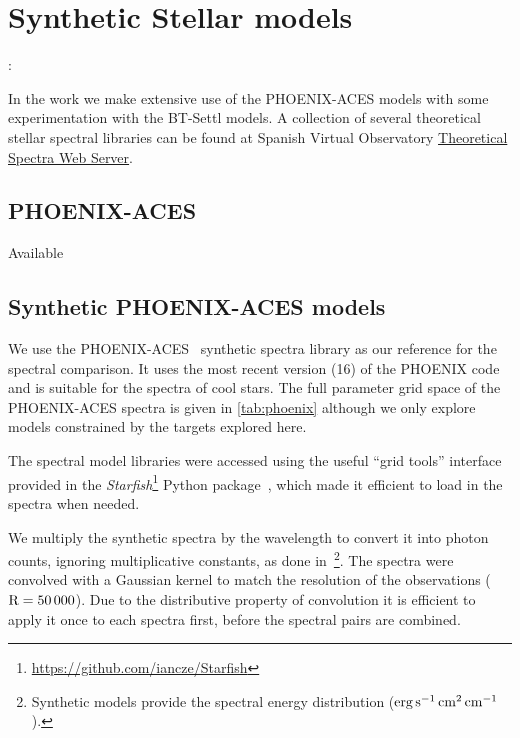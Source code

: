 
\section{Synthetic Stellar models}:

In the work we make extensive use of the {PHOENIX-ACES} models with some experimentation with the {BT-Settl} models.
A collection of several theoretical stellar spectral libraries can be found at Spanish Virtual Observatory \href{http://svo2.cab.inta-csic.es/theory/newov/index.php}{Theoretical Spectra Web Server}.



\subsection{PHOENIX-ACES}

Available 


\subsection{Synthetic {PHOENIX-ACES} models}
\label{subsec:spec_models}
We use the {PHOENIX-ACES}~\citep{husser_new_2013} synthetic spectra library as our reference for the spectral comparison.
It uses the most recent version (16) of the {PHOENIX} code and is suitable for the spectra of cool stars.
The full parameter grid space of the {PHOENIX-ACES} spectra is given in \cref{tab:phoenix} although we only explore models constrained by the targets explored here.



The spectral model libraries were accessed using the useful ``grid tools'' interface provided in the \emph{Starfish}\footnote{\url{https://github.com/iancze/Starfish}} Python package~\citep{czekala_constructing_2015}, which made it efficient to load in the spectra when needed.

We multiply the synthetic spectra by the wavelength to convert it into photon counts, ignoring multiplicative constants, as done in~\citet{figueira_radial_2016}\footnote{Synthetic models provide the spectral energy distribution (\(\rm erg\,s^{-1}\,cm^{2}\,cm^{-1}\)).}.
The spectra were convolved with a Gaussian kernel to match the resolution of the observations (\(\rm R=50\,000\)).
Due to the distributive property of convolution it is efficient to apply it once to each spectra first, before the spectral pairs are combined.

